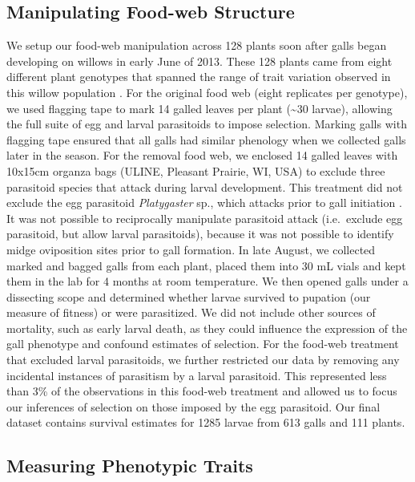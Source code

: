 \documentclass[11pt,]{article}
\begin{document}
\subsection{Manipulating Food-web
Structure}\label{manipulating-food-web-structure}

We setup our food-web manipulation across 128 plants soon after galls
began developing on willows in early June of 2013. These 128 plants came
from eight different plant genotypes that spanned the range of trait
variation observed in this willow population \citep{Barbour2015}. For
the original food web (eight replicates per genotype), we used flagging
tape to mark 14 galled leaves per plant (\textasciitilde{}30 larvae),
allowing the full suite of egg and larval parasitoids to impose
selection. Marking galls with flagging tape ensured that all galls had
similar phenology when we collected galls later in the season. For the
removal food web, we enclosed 14 galled leaves with 10x15cm organza bags
(ULINE, Pleasant Prairie, WI, USA) to exclude three parasitoid species
that attack during larval development. This treatment did not exclude
the egg parasitoid \emph{Platygaster} sp., which attacks prior to gall
initiation \citep[larva initiate gall development in Cecidomyiid
midges:][]{Gagne1989}. It was not possible to reciprocally manipulate
parasitoid attack (i.e.~exclude egg parasitoid, but allow larval
parasitoids), because it was not possible to identify midge oviposition
sites prior to gall formation. In late August, we collected marked and
bagged galls from each plant, placed them into 30 mL vials and kept them
in the lab for 4 months at room temperature. We then opened galls under
a dissecting scope and determined whether larvae survived to pupation
(our measure of fitness) or were parasitized. We did not include other
sources of mortality, such as early larval death, as they could
influence the expression of the gall phenotype and confound estimates of
selection. For the food-web treatment that excluded larval parasitoids,
we further restricted our data by removing any incidental instances of
parasitism by a larval parasitoid. This represented less than 3\% of the
observations in this food-web treatment and allowed us to focus our
inferences of selection on those imposed by the egg parasitoid. Our
final dataset contains survival estimates for 1285 larvae from 613 galls
and 111 plants.

\subsection{Measuring Phenotypic
Traits}\label{measuring-phenotypic-traits}
\end{document}
